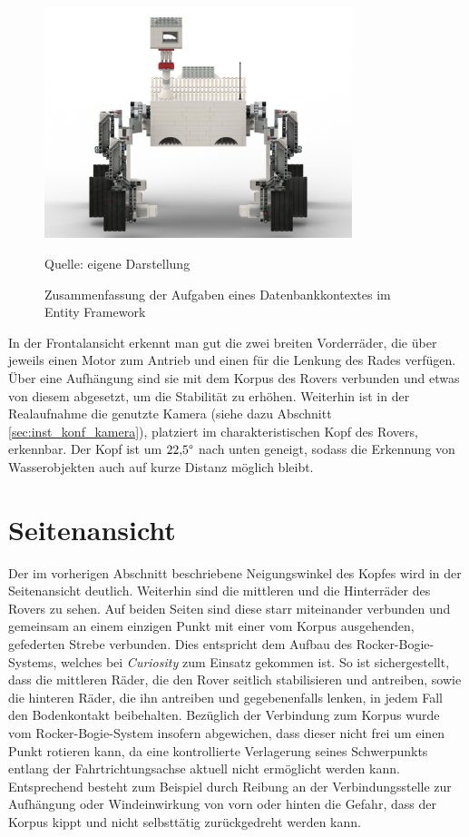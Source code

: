 \begin{figure}
	\centering
	\includegraphics[width=0.8\textwidth]{../Images/Mars_Rover_V5_front_shadow.png}
	\vspace{0.5em}
	\parbox[c]{0.8\linewidth}{\footnotesize
		\centering
		\vspace{1em}
		Quelle: eigene Darstellung
	}
	\caption{Zusammenfassung der Aufgaben eines Datenbankkontextes im Entity Framework}
	\label{fig:dbcontext2}
\end{figure}

In der Frontalansicht erkennt man gut die zwei breiten Vorderräder, die über jeweils einen Motor zum Antrieb und einen für die Lenkung des Rades verfügen.
Über eine Aufhängung sind sie mit dem Korpus des Rovers verbunden und etwas von diesem abgesetzt, um die Stabilität zu erhöhen.
Weiterhin ist in der Realaufnahme die genutzte Kamera (siehe dazu Abschnitt \ref{sec:inst_konf_kamera}), platziert im charakteristischen Kopf des Rovers, erkennbar.
Der Kopf ist um $22{,}5 \degree$ nach unten geneigt, sodass die Erkennung von Wasserobjekten auch auf kurze Distanz möglich bleibt.

\section{Seitenansicht}
\label{sec:seitenansicht}

Der im vorherigen Abschnitt beschriebene Neigungswinkel des Kopfes wird in der Seitenansicht deutlich.
Weiterhin sind die mittleren und die Hinterräder des Rovers zu sehen.
Auf beiden Seiten sind diese starr miteinander verbunden und gemeinsam an einem einzigen Punkt mit einer vom Korpus ausgehenden, gefederten Strebe verbunden.
Dies entspricht dem Aufbau des Rocker-Bogie-Systems, welches bei \textit{Curiosity} zum Einsatz gekommen ist.
So ist sichergestellt, dass die mittleren Räder, die den Rover seitlich stabilisieren und antreiben, sowie die hinteren Räder, die ihn antreiben und gegebenenfalls lenken, in jedem Fall den Bodenkontakt beibehalten.
Bezüglich der Verbindung zum Korpus wurde vom Rocker-Bogie-System insofern abgewichen, dass dieser nicht frei um einen Punkt rotieren kann, da eine kontrollierte Verlagerung seines Schwerpunkts entlang der Fahrtrichtungsachse aktuell nicht ermöglicht werden kann.
Entsprechend besteht zum Beispiel durch Reibung an der Verbindungsstelle zur Aufhängung oder Windeinwirkung von vorn oder hinten die Gefahr, dass der Korpus kippt und nicht selbsttätig zurückgedreht werden kann.

